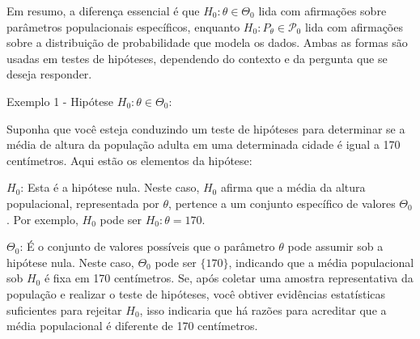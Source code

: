 \documentclass[12pt]{beamer}
\begin{document}
\begin{frame}{}
\begin{block}{}
\justifying
Em resumo, a diferença essencial é que $H_{0}: \theta \in \Theta_{0}$ lida com afirmações sobre parâmetros populacionais específicos, enquanto $H_{0}: P_{\theta} \in \mathcal{P}_{0}$ lida com afirmações sobre a distribuição de probabilidade que modela os dados. Ambas as formas são usadas em testes de hipóteses, dependendo do contexto e da pergunta que se deseja responder.
\end{block}
\end{frame}

\begin{frame}{}
\vspace{-0.2cm}
\begin{block}{}
\justifying
Exemplo 1 - Hipótese $H_{0}: \theta \in \Theta_{0}$:
\end{block}
\pause
\begin{block}{}
\justifying
Suponha que você esteja conduzindo um teste de hipóteses para determinar se a média de altura da população adulta em uma determinada cidade é igual a 170 centímetros. Aqui estão os elementos da hipótese:
\pause
\begin{block}{}
\justifying
$H_{0}$: Esta é a hipótese nula. Neste caso, $H_{0}$ afirma que a média da altura populacional, representada por $\theta$, pertence a um conjunto específico de valores $\Theta_{0}$. Por exemplo, $H_{0}$ pode ser $H_{0}: \theta = 170$.
\end{block}
\pause
\begin{block}{}
\justifying
$\Theta_{0}$: É o conjunto de valores possíveis que o parâmetro $\theta$ pode assumir sob a hipótese nula. Neste caso, $\Theta_{0}$ pode ser $\{170\}$, indicando que a média populacional sob $H_{0}$ é fixa em 170 centímetros. Se, após coletar uma amostra representativa da população e realizar o teste de hipóteses, você obtiver evidências estatísticas suficientes para rejeitar $H_{0}$, isso indicaria que há razões para acreditar que a média populacional é diferente de 170 centímetros.
\end{block}

\end{block}
\end{frame}
\end{document}
